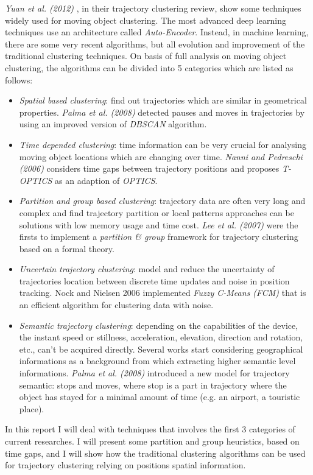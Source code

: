\textit{Yuan et al. (2012)} \cite{AIReview}, in their trajectory clustering review, show some techniques widely used for moving object clustering. The most advanced deep learning techniques use an architecture called \textit{Auto-Encoder}. Instead, in machine learning, there are some very recent algorithms, but all evolution and improvement of the traditional clustering techniques. On basis of full analysis on moving object clustering, the algorithms can be divided into 5 categories which are listed as follows:
\begin{itemize}
	\item \textit{Spatial based clustering}: find out trajectories which are similar in geometrical properties. \textit{Palma et al. (2008)} \cite{Palma2008} detected pauses and moves in trajectories by using an improved version of \textit{DBSCAN} algorithm.
	\item \textit{Time depended clustering}: time information can be very crucial for analysing moving object locations which are changing over time. \textit{Nanni and Pedreschi (2006)} \cite{Nanni2006} considers time gaps between trajectory positions and proposes \textit{T-OPTICS} as an adaption of \textit{OPTICS}.
	\item \textit{Partition and group based clustering}: trajectory data are often very long and complex and find trajectory partition or local patterns approaches can be solutions with low memory usage and time cost. \textit{Lee et al. (2007)} \cite{Lee2007} were the firsts to implement a \textit{partition \& group} framework for trajectory clustering based on a formal theory.
	\item \textit{Uncertain trajectory clustering}: model and reduce the uncertainty of trajectories location between discrete time updates and noise in position tracking. Nock and Nielsen 2006 \cite{Nock2006} implemented \textit{Fuzzy C-Means (FCM)} that is an efficient algorithm for clustering data with noise.
	\item \textit{Semantic trajectory clustering}: depending on the capabilities of the device, the instant speed or stillness, acceleration, elevation, direction and rotation, etc., can’t be acquired directly. Several works start considering geographical informations as a background from which extracting higher semantic level informations. \textit{Palma et al. (2008)} \cite{Palma2008} introduced a new model for trajectory semantic: stops and moves, where stop is a part in trajectory where the object has stayed for a minimal amount of time (e.g. an airport, a touristic place).
\end{itemize}

In this report I will deal with techniques that involves the first 3 categories of current researches. I will present some partition and group heuristics, based on time gaps, and I will show how the traditional clustering algorithms can be used for trajectory clustering relying on positions spatial information.
